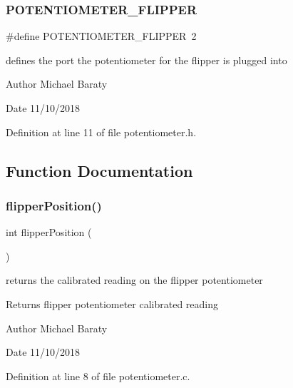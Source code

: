 \subsubsection{P\+O\+T\+E\+N\+T\+I\+O\+M\+E\+T\+E\+R\+\_\+\+F\+L\+I\+P\+P\+ER}
{\footnotesize\ttfamily \#define P\+O\+T\+E\+N\+T\+I\+O\+M\+E\+T\+E\+R\+\_\+\+F\+L\+I\+P\+P\+ER~2}



defines the port the potentiometer for the flipper is plugged into 

\begin{DoxyAuthor}{Author}
Michael Baraty 
\end{DoxyAuthor}
\begin{DoxyDate}{Date}
11/10/2018 
\end{DoxyDate}


Definition at line 11 of file potentiometer.\+h.



\subsection{Function Documentation}
\mbox{\label{potentiometer_8h_a017a6ff636af5e7916ffc8229dc408d3}} 
\subsubsection{flipper\+Position()}
{\footnotesize\ttfamily int flipper\+Position (\begin{DoxyParamCaption}{ }\end{DoxyParamCaption})}



returns the calibrated reading on the flipper potentiometer 

\begin{DoxyReturn}{Returns}
flipper potentiometer calibrated reading 
\end{DoxyReturn}
\begin{DoxyAuthor}{Author}
Michael Baraty 
\end{DoxyAuthor}
\begin{DoxyDate}{Date}
11/10/2018 
\end{DoxyDate}


Definition at line 8 of file potentiometer.\+c.

\mbox{\label{potentiometer_8h_a409cc2adce7e93d62c996f406cdf25b1}} 
